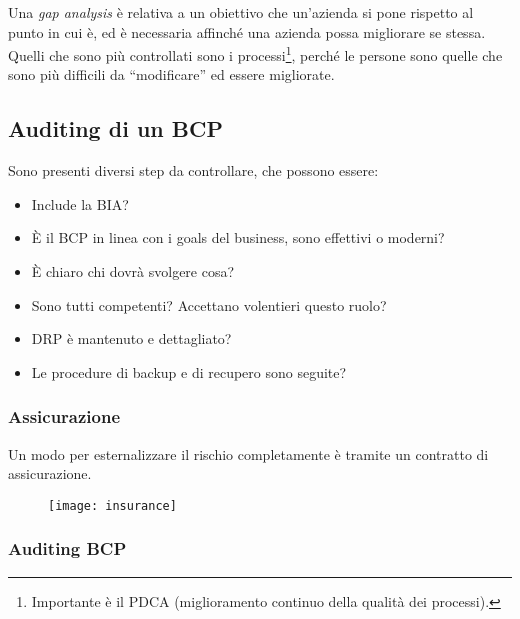 Una \textit{gap analysis} è relativa a un obiettivo che un'azienda si pone 
rispetto al punto in cui è, ed è necessaria affinché una azienda possa 
migliorare se stessa. Quelli che sono più controllati sono i 
processi\footnote{Importante è il PDCA (miglioramento continuo della qualità 
dei processi).}, perché le persone sono quelle che sono più difficili da 
``modificare'' ed essere migliorate.

\subsection{Auditing di un BCP}

Sono presenti diversi step da controllare, che possono essere:
\begin{itemize}
  \item Include la BIA?
  \item È il BCP in linea con i goals del business, sono effettivi o moderni?
  \item È chiaro chi dovrà svolgere cosa?
  \item Sono tutti competenti? Accettano volentieri questo ruolo?
  \item DRP è mantenuto e dettagliato?
  \item Le procedure di backup e di recupero sono seguite?
\end{itemize}

\subsubsection{Assicurazione}

Un modo per esternalizzare il rischio completamente è tramite un contratto di assicurazione.

\begin{figure}[H]
\centering
\texttt{[image: insurance]}
\end{figure}

\subsubsection{Auditing BCP}

